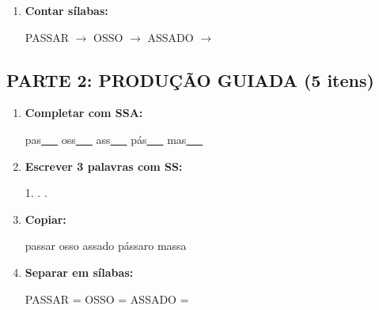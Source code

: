 \begin{exercicio}
\begin{enumerate}
  \item \textbf{Contar sílabas:}
  \begin{center}
  PASSAR $\rightarrow$ \underline{\hspace{0.9cm}} \quad OSSO $\rightarrow$ \underline{\hspace{0.9cm}} \quad ASSADO $\rightarrow$ \underline{\hspace{0.9cm}}
  \end{center}

\end{enumerate}

\subsection*{PARTE 2: PRODUÇÃO GUIADA (5 itens)}

\begin{enumerate}[resume]

  \item \textbf{Completar com SSA:}
  \begin{center}
  pas\underline{~~~} \quad oss\underline{~~~} \quad ass\underline{~~~} \quad pás\underline{~~~} \quad mas\underline{~~~}
  \end{center}

  \item \textbf{Escrever 3 palavras com SS:}
  \begin{center}
  1. \underline{\hspace{3cm}} . \underline{\hspace{3cm}} . \underline{\hspace{3cm}}
  \end{center}

  \item \textbf{Copiar:}
  \begin{center}
  passar \quad osso \quad assado \quad pássaro \quad massa
  \end{center}

  \item \textbf{Separar em sílabas:}
  \begin{center}
  PASSAR = \underline{\hspace{1cm}} \underline{\hspace{1cm}} \quad OSSO = \underline{\hspace{1cm}} \underline{\hspace{1cm}} \quad ASSADO = \underline{\hspace{1cm}} \underline{\hspace{1cm}}
  \end{center}


\end{enumerate}
\end{exercicio}
